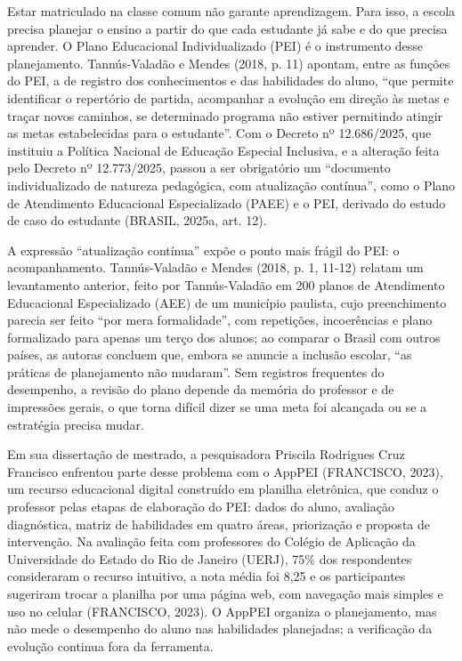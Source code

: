 Estar matriculado na classe comum não garante aprendizagem. Para isso, a escola precisa planejar o ensino a partir do que cada estudante já sabe e do que precisa aprender. O Plano Educacional Individualizado (PEI) é o instrumento desse planejamento. Tannús-Valadão e Mendes (2018, p. 11) apontam, entre as funções do PEI, a de registro dos conhecimentos e das habilidades do aluno, “que permite identificar o repertório de partida, acompanhar a evolução em direção às metas e traçar novos caminhos, se determinado programa não estiver permitindo atingir as metas estabelecidas para o estudante”. Com o Decreto nº 12.686/2025, que instituiu a Política Nacional de Educação Especial Inclusiva, e a alteração feita pelo Decreto nº 12.773/2025, passou a ser obrigatório um “documento individualizado de natureza pedagógica, com atualização contínua”, como o Plano de Atendimento Educacional Especializado (PAEE) e o PEI, derivado do estudo de caso do estudante (BRASIL, 2025a, art. 12).

A expressão “atualização contínua” expõe o ponto mais frágil do PEI: o acompanhamento. Tannús-Valadão e Mendes (2018, p. 1, 11-12) relatam um levantamento anterior, feito por Tannús-Valadão em 200 planos de Atendimento Educacional Especializado (AEE) de um município paulista, cujo preenchimento parecia ser feito “por mera formalidade”, com repetições, incoerências e plano formalizado para apenas um terço dos alunos; ao comparar o Brasil com outros países, as autoras concluem que, embora se anuncie a inclusão escolar, “as práticas de planejamento não mudaram”. Sem registros frequentes do desempenho, a revisão do plano depende da memória do professor e de impressões gerais, o que torna difícil dizer se uma meta foi alcançada ou se a estratégia precisa mudar.

Em sua dissertação de mestrado, a pesquisadora Priscila Rodrigues Cruz Francisco enfrentou parte desse problema com o AppPEI (FRANCISCO, 2023), um recurso educacional digital construído em planilha eletrônica, que conduz o professor pelas etapas de elaboração do PEI: dados do aluno, avaliação diagnóstica, matriz de habilidades em quatro áreas, priorização e proposta de intervenção. Na avaliação feita com professores do Colégio de Aplicação da Universidade do Estado do Rio de Janeiro (UERJ), 75\% dos respondentes consideraram o recurso intuitivo, a nota média foi 8,25 e os participantes sugeriram trocar a planilha por uma página web, com navegação mais simples e uso no celular (FRANCISCO, 2023). O AppPEI organiza o planejamento, mas não mede o desempenho do aluno nas habilidades planejadas; a verificação da evolução continua fora da ferramenta.

